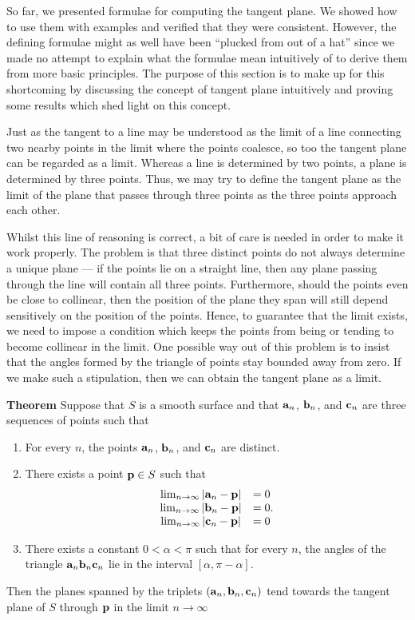 \documentclass[12pt]{article}
\begin{document}
So far, we presented formulae for computing the tangent plane.  We showed how to use them with examples and verified that they were consistent.  However, the defining formulae might as well have been ``plucked from out of a hat'' since we made no attempt to explain what the formulae mean intuitively of to derive them from more basic principles.  The purpose of this section is to make up for this shortcoming by discussing the concept of tangent plane intuitively and proving some results which shed light on this concept.

Just as the tangent to a line may be understood as the limit of a line connecting two nearby points in the limit where the points coalesce, so too the tangent plane can be regarded as a limit.  Whereas a line is determined by two points, a plane is determined by three points.  Thus, we may try to define the tangent plane as the limit of the plane that passes through three points as the three points approach each other.

Whilst this line of reasoning is correct, a bit of care is needed in order to make it work properly.  The problem is that three distinct points do not always determine a unique plane --- if the points lie on a straight line, then any plane passing through the line will contain all three points.  Furthermore, should the points even be close to collinear, then the position of the plane they span will still depend sensitively on the position of the points.  Hence, to guarantee that the limit exists, we need to impose a condition which keeps the points from  being or tending to become collinear in the limit.  One possible way out of this problem is to insist that the angles formed by the triangle of points stay bounded away from zero.  If we make such a stipulation, then we can obtain the tangent plane as a limit.

{\bf Theorem}  Suppose that $S$ is a smooth surface and that ${\bf a}_n$, ${\bf b}_n$, and ${\bf c}_n$ are three sequences of points such that
\begin{enumerate}
\item For every $n$, the points ${\bf a}_n$, ${\bf b}_n$, and ${\bf c}_n$ are distinct.
\item There exists a point ${\bf p} \in S$ such that 
 $$\begin{matrix} \lim_{n \to \infty} |{\bf a}_n - {\bf p}| &= 0 \\ \lim_{n \to \infty} |{\bf b}_n - {\bf p}| &= 0 \\ \lim_{n \to \infty} |{\bf c}_n - {\bf p}| &= 0 \end{matrix}.$$
\item There exists a constant $0 < \alpha < \pi$ such that for every $n$, the angles of the triangle ${\bf a}_n {\bf b}_n {\bf c}_n$ lie in the interval $[\alpha, \pi - \alpha]$.
\end{enumerate}
Then the planes spanned by the triplets $({\bf a}_n, {\bf b}_n, {\bf c}_n)$ tend towards the tangent plane of $S$ through ${\bf p}$ in the limit $n \to \infty$
 
\end{document}
